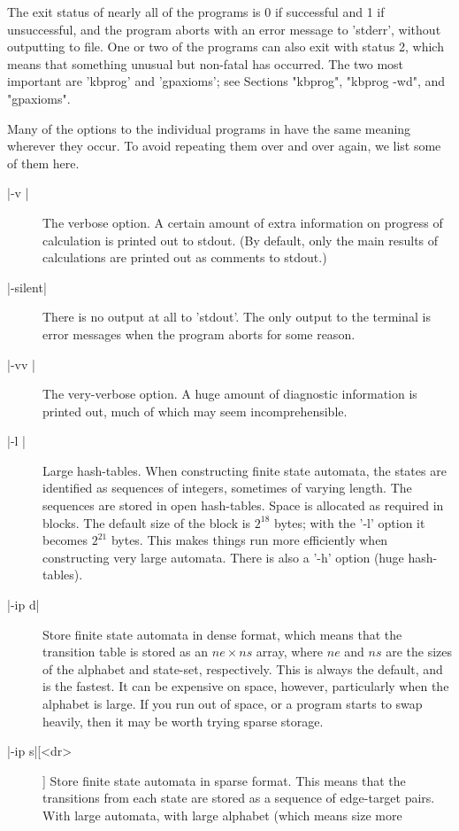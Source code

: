 
The exit status of nearly all of the programs is 0 if successful and
1 if unsuccessful, and the program aborts with an error message
to 'stderr', without outputting to file.
One or two of the programs can also exit with status 2, which means that
something unusual but non-fatal has occurred. The two most important are
'kbprog' and 'gpaxioms'; see Sections "kbprog", "kbprog -wd", and
"gpaxioms".

Many of the options to the individual programs in {\KBMAG} have the same
meaning wherever they occur. To avoid repeating them over and over again, we
list some of them here.
\begin{description}
\item[|-v |]
The verbose option. A certain amount of extra information on progress of
calculation is printed out to stdout.
(By default, only the main results of calculations are printed out as
comments to stdout.)
\item[|-silent|]
There is no output at all to 'stdout'.
The only output to the terminal is error messages when the program
aborts for some reason.
\item[|-vv |]
The very-verbose option. A huge amount of diagnostic information is printed out,
much of which may seem incomprehensible.
\item[|-l |]
Large hash-tables. When constructing finite state automata, the states
are identified as sequences of integers, sometimes of varying length.
The sequences are stored in open hash-tables. Space is allocated as
required in blocks. The default size of the block is $2^{18}$ bytes;
with the '-l' option it becomes $2^{21}$ bytes. This makes things
run more efficiently when constructing very large automata.
There is also a '-h' option (huge hash-tables).
\item[|-ip d|]
Store finite state automata in dense format, which means that the
transition table is stored as an $ne \times ns$ array, where $ne$ and
$ns$ are the sizes of the alphabet  and state-set, respectively.
This is always the default, and is the fastest. It can be expensive on
space, however, particularly when the alphabet is large. If you run out
of space, or a program starts to swap heavily, then it may be worth trying
sparse storage.
\item[|-ip s|[<dr>]]
Store finite state automata in sparse format. This means that the
transitions from each state are stored as a sequence of edge-target
pairs. With large automata, with large alphabet (which means size more

\end{description}
